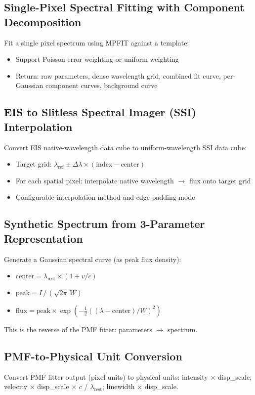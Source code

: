 \documentclass[11pt,a4paper]{article}
\begin{document}
\subsection{Single-Pixel Spectral Fitting with Component Decomposition}
Fit a single pixel spectrum using MPFIT against a template:
\begin{itemize}[nosep]
  \item Support Poisson error weighting or uniform weighting
  \item Return: raw parameters, dense wavelength grid, combined fit curve, per-Gaussian component curves, background curve
\end{itemize}

\subsection{EIS to Slitless Spectral Imager (SSI) Interpolation}
Convert EIS native-wavelength data cube to uniform-wavelength SSI data cube:
\begin{itemize}[nosep]
  \item Target grid: $\lambda_{\text{ref}} \pm \Delta\lambda \times (\text{index} - \text{center})$
  \item For each spatial pixel: interpolate native wavelength $\rightarrow$ flux onto target grid
  \item Configurable interpolation method and edge-padding mode
\end{itemize}

\subsection{Synthetic Spectrum from 3-Parameter Representation}
Generate a Gaussian spectral curve (as peak flux density):
\begin{itemize}[nosep]
  \item $\text{center} = \lambda_{\text{rest}} \times (1 + v / c)$
  \item $\text{peak} = I \,/\, (\sqrt{2\pi}\,W)$
  \item $\text{flux} = \text{peak} \times \exp(-\frac12((\lambda - \text{center})/W)^2)$
\end{itemize}
This is the reverse of the PMF fitter: parameters $\rightarrow$ spectrum.

\subsection{PMF-to-Physical Unit Conversion}
Convert PMF fitter output (pixel units) to physical units: intensity $\times$ disp\_scale; velocity $\times$ disp\_scale $\times$ $c$ / $\lambda_{\text{rest}}$; linewidth $\times$ disp\_scale.
\end{document}
